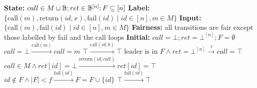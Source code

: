\begin{transys}
    \label{PLTS:BRB}
    \caption{Encoding of \textsf{BRB}}
    \begin{algorithmic}
        \State \textbf{State:} $call \in M\cup\mathbb{B}; ret \in \mathbb{B}^{[n]}; F \subseteq [n]$
        \State \textbf{Label:} $\{\text{call}(m), \text{return}(id,x), \text{fail}(id) \mid
        id \in [n], m \in M\}$
        \State \textbf{Input:} $\{\text{call}(m), \text{fail}(id) \mid id \in [n], m \in M\}$
        \State \textbf{Fairness:} all transitions are fair except those labelled by fail and the
        call loops
        \State \textbf{Initial:} $call = \bot; ret = \bot^{[n]}; F = \emptyset$
        \medskip
        \State
        $call = \bot
        \xrightarrow{\text{call}(m)}
        call = m$
        \State
        $\top
        \xrightarrow{\text{call}(id,b)}
        \top$ 
        \State
        $\text{leader is in } F
        \wedge ret = \bot^{[n]}
        \xrightarrow{\tau}
        call = \top$
        \State
        $call \in M \wedge ret[id] = \bot
        \xrightarrow{\text{return}(id,call)}
        ret[id] = \top$
        \State
        $id \not\in F \wedge |F| < f
        \xrightarrow{\text{fail}(id)}
        F = F \cup \{id\}$
        \State
        $\top
        \xrightarrow{\text{fail}(id)}
        \top$ 
    \end{algorithmic}
\end{transys}

